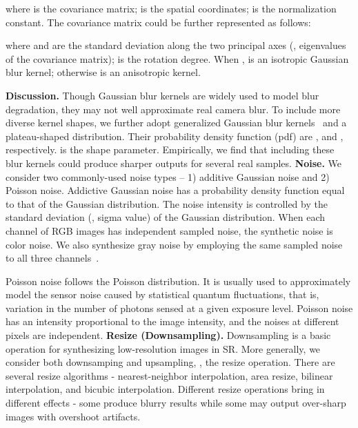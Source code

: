 \documentclass[10pt,twocolumn,letterpaper]{article}
\begin{document}
where  is the covariance matrix;  is the spatial coordinates;  is the normalization constant.
The covariance matrix could be further represented as follows:
\vspace{-0.2cm}

where  and  are the standard deviation along the two principal axes (\ie, eigenvalues of the covariance matrix);  is the rotation degree.
When ,  is an isotropic Gaussian blur kernel; otherwise   is an anisotropic kernel.


\noindent\textbf{Discussion.}
Though Gaussian blur kernels are widely used to model blur degradation,
they may not well approximate real camera blur.
To include more diverse kernel shapes, we further adopt generalized Gaussian blur kernels~\cite{liu2020estimating} and a plateau-shaped distribution. Their probability density function (pdf) are , and , respectively.  is the shape parameter.
Empirically, we find that including these blur kernels could produce sharper outputs for several real samples.
\newline\newline
\noindent\textbf{Noise.}
We consider two commonly-used noise types -- 1) additive Gaussian noise and 2) Poisson noise.
Addictive Gaussian noise has a probability density function equal to that of the Gaussian distribution.
The noise intensity is controlled by the standard deviation (\ie, sigma value) of the Gaussian distribution.
When each channel of RGB images has independent sampled noise, the synthetic noise is color noise.
We also synthesize gray noise by employing the same sampled noise to all three channels~\cite{zhang2021designing,nam2016holistic}.

Poisson noise follows the Poisson distribution. It is usually used to approximately model the sensor noise caused by statistical quantum fluctuations, that is, variation in the number of photons sensed at a given exposure level.
Poisson noise has an intensity proportional to the image intensity, and the noises at different pixels are independent.
\newline\newline
\noindent\textbf{Resize (Downsampling).}
Downsampling is a basic operation for synthesizing low-resolution images in SR.
More generally, we consider both downsamping and upsampling, \ie, the resize operation.
There are several resize algorithms -  nearest-neighbor interpolation, area resize, bilinear interpolation, and bicubic interpolation. Different resize operations bring in different effects - some produce blurry results while some may output over-sharp images with overshoot artifacts.
\end{document}
